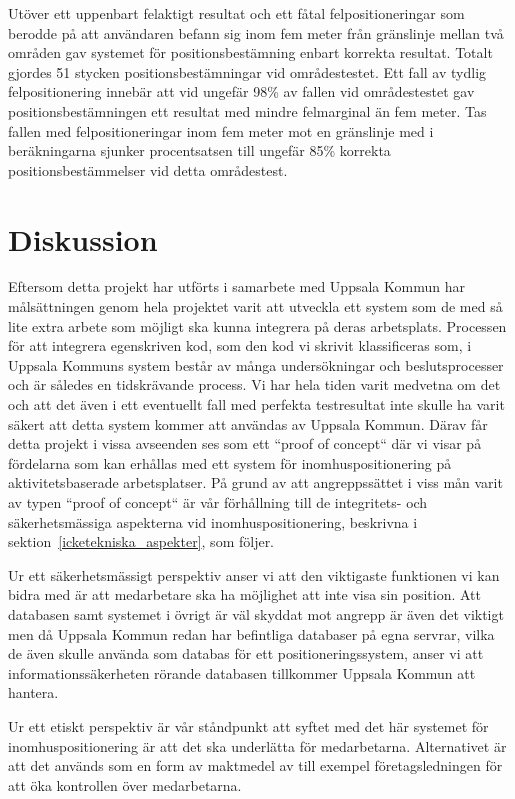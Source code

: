 \documentclass[a4paper,12pt]{article}
\begin{document}
 Utöver ett uppenbart felaktigt resultat och ett fåtal felpositioneringar som berodde på att användaren befann sig inom fem meter från gränslinje mellan två områden gav systemet för positionsbestämning enbart korrekta resultat. Totalt gjordes 51 stycken positionsbestämningar vid områdestestet. Ett fall av tydlig felpositionering innebär att vid ungefär 98\% av fallen vid områdestestet gav positionsbestämningen ett resultat med mindre felmarginal än fem meter. Tas fallen med felpositioneringar inom fem meter mot en gränslinje med i beräkningarna sjunker procentsatsen till ungefär 85\% korrekta positionsbestämmelser vid detta områdestest.

\section{Diskussion}
Eftersom detta projekt har utförts i samarbete med Uppsala Kommun har målsättningen genom hela projektet varit att utveckla ett system som de med så lite extra arbete som möjligt ska kunna integrera på deras arbetsplats. Processen för att integrera egenskriven kod, som den kod vi skrivit klassificeras som, i Uppsala Kommuns system består av många undersökningar och beslutsprocesser och är således en tidskrävande process. Vi har hela tiden varit medvetna om det och att det även i ett eventuellt fall med perfekta testresultat inte skulle ha varit säkert att detta system kommer att användas av Uppsala Kommun. Därav får detta projekt i vissa avseenden ses som ett ``proof of concept`` där vi visar på fördelarna som kan erhållas med ett system för inomhuspositionering på aktivitetsbaserade arbetsplatser. På grund av att angreppssättet i viss mån varit av typen ``proof of concept`` är vår förhållning till de integritets- och säkerhetsmässiga aspekterna vid inomhuspositionering, beskrivna i sektion~\ref{icketekniska_aspekter}, som följer.

Ur ett säkerhetsmässigt perspektiv anser vi att den viktigaste funktionen vi kan bidra med är att medarbetare ska ha möjlighet att inte visa sin position. Att databasen samt systemet i övrigt är väl skyddat mot angrepp är även det viktigt men då Uppsala Kommun redan har befintliga databaser på egna servrar, vilka de även skulle använda som databas för ett positioneringssystem, anser vi att informationssäkerheten rörande databasen tillkommer Uppsala Kommun att hantera.

Ur ett etiskt perspektiv är vår ståndpunkt att syftet med det här systemet för inomhuspositionering är att det ska underlätta för medarbetarna. Alternativet är att det används som en form av maktmedel av till exempel företagsledningen för att öka kontrollen över medarbetarna.
\end{document}

